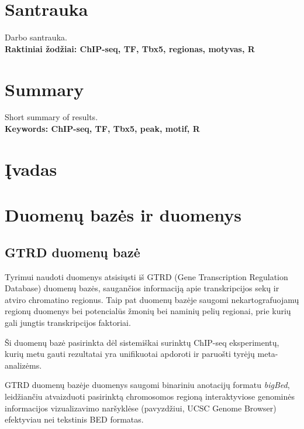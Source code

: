 \documentclass[12pt]{article}
\begin{document}
\section*{Santrauka}
Darbo santrauka.\\

\textbf{Raktiniai žodžiai: ChIP-seq, TF, Tbx5, regionas, motyvas, R}
\newpage

\section*{Summary}
Short summary of results.\\

\textbf{Keywords: ChIP-seq, TF, Tbx5, peak, motif, R}
\newpage

\section{Įvadas}
\newpage

\section{Duomenų bazės ir duomenys}
\subsection{GTRD duomenų bazė}
Tyrimui naudoti duomenys atsisiųsti iš GTRD
(Gene Transcription Regulation Database)\cite{GTRD}
duomenų bazės, saugančios informaciją apie transkripcijos
sekų ir atviro chromatino regionus. Taip pat duomenų bazėje saugomi
nekartografuojamų regionų duomenys bei potencialūs žmonių bei naminių
pelių regionai, prie kurių gali jungtis transkripcijos faktoriai.

Ši duomenų bazė pasirinkta dėl sistemiškai surinktų
ChIP-seq eksperimentų, kurių metu gauti rezultatai yra unifikuotai
apdoroti ir paruošti tyrėjų meta-analizėms.

GTRD duomenų bazėje duomenys saugomi binariniu anotacijų
formatu \emph{bigBed}, leidžiančiu atvaizduoti pasirinktą
chromosomos regioną interaktyviose genominės informacijos
vizualizavimo naršyklėse (pavyzdžiui, UCSC Genome Browser\cite{UCSCGB})
efektyviau nei tekstinis BED formatas.
\end{document}

